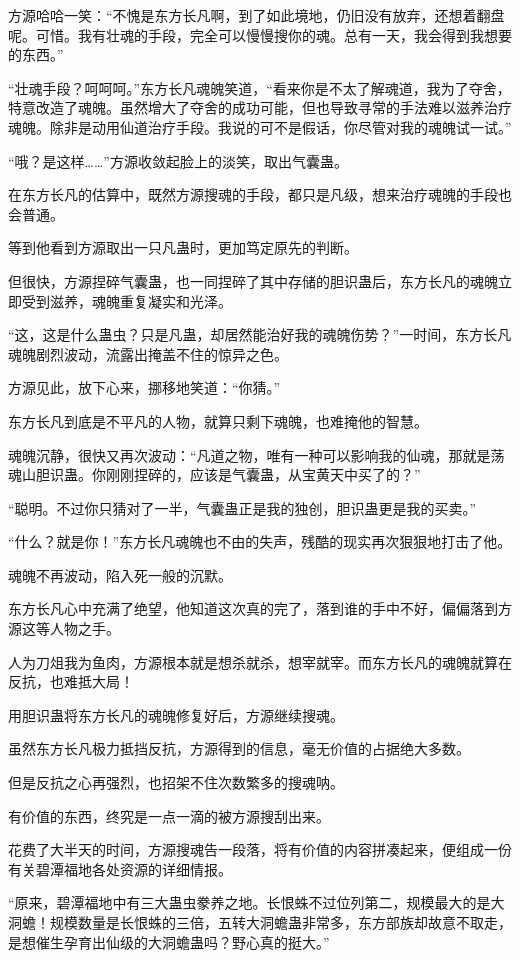\begin{this_body}
方源哈哈一笑：“不愧是东方长凡啊，到了如此境地，仍旧没有放弃，还想着翻盘呢。可惜。我有壮魂的手段，完全可以慢慢搜你的魂。总有一天，我会得到我想要的东西。”

“壮魂手段？呵呵呵。”东方长凡魂魄笑道，“看来你是不太了解魂道，我为了夺舍，特意改造了魂魄。虽然增大了夺舍的成功可能，但也导致寻常的手法难以滋养治疗魂魄。除非是动用仙道治疗手段。我说的可不是假话，你尽管对我的魂魄试一试。”

“哦？是这样……”方源收敛起脸上的淡笑，取出气囊蛊。

在东方长凡的估算中，既然方源搜魂的手段，都只是凡级，想来治疗魂魄的手段也会普通。

等到他看到方源取出一只凡蛊时，更加笃定原先的判断。

但很快，方源捏碎气囊蛊，也一同捏碎了其中存储的胆识蛊后，东方长凡的魂魄立即受到滋养，魂魄重复凝实和光泽。

“这，这是什么蛊虫？只是凡蛊，却居然能治好我的魂魄伤势？”一时间，东方长凡魂魄剧烈波动，流露出掩盖不住的惊异之色。

方源见此，放下心来，挪移地笑道：“你猜。”

东方长凡到底是不平凡的人物，就算只剩下魂魄，也难掩他的智慧。

魂魄沉静，很快又再次波动：“凡道之物，唯有一种可以影响我的仙魂，那就是荡魂山胆识蛊。你刚刚捏碎的，应该是气囊蛊，从宝黄天中买了的？”

“聪明。不过你只猜对了一半，气囊蛊正是我的独创，胆识蛊更是我的买卖。”

“什么？就是你！”东方长凡魂魄也不由的失声，残酷的现实再次狠狠地打击了他。

魂魄不再波动，陷入死一般的沉默。

东方长凡心中充满了绝望，他知道这次真的完了，落到谁的手中不好，偏偏落到方源这等人物之手。

人为刀俎我为鱼肉，方源根本就是想杀就杀，想宰就宰。而东方长凡的魂魄就算在反抗，也难抵大局！

用胆识蛊将东方长凡的魂魄修复好后，方源继续搜魂。

虽然东方长凡极力抵挡反抗，方源得到的信息，毫无价值的占据绝大多数。

但是反抗之心再强烈，也招架不住次数繁多的搜魂呐。

有价值的东西，终究是一点一滴的被方源搜刮出来。

花费了大半天的时间，方源搜魂告一段落，将有价值的内容拼凑起来，便组成一份有关碧潭福地各处资源的详细情报。

“原来，碧潭福地中有三大蛊虫豢养之地。长恨蛛不过位列第二，规模最大的是大洞蟾！规模数量是长恨蛛的三倍，五转大洞蟾蛊非常多，东方部族却故意不取走，是想催生孕育出仙级的大洞蟾蛊吗？野心真的挺大。”


\end{this_body}
